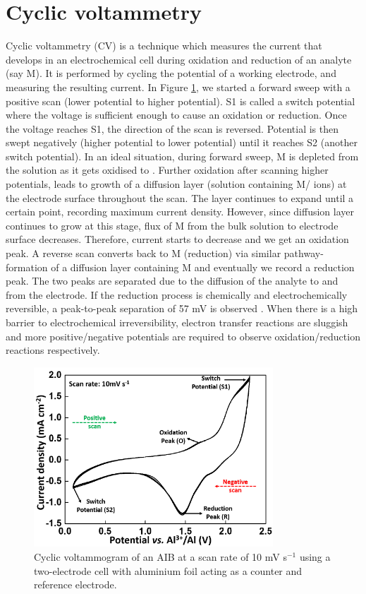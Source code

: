 \section{Cyclic voltammetry}
Cyclic voltammetry (CV) is a technique which measures the current that develops in an electrochemical cell during oxidation and reduction of an analyte (say M). It is performed by cycling the potential of a working electrode, and measuring the resulting current. In Figure \ref{Figures/chap2fig:CV}, we started a forward sweep with a positive scan (lower potential to higher potential). S1 is called a switch potential where the voltage is sufficient enough to cause an oxidation or reduction. Once the voltage reaches S1, the direction of the scan is reversed. Potential is then swept negatively (higher potential to lower potential) until it reaches S2 (another switch potential). In an ideal situation, during forward sweep, M is depleted from the solution as it gets oxidised to . Further oxidation after scanning higher potentials, leads to growth of a diffusion layer (solution containing M/ ions) at the electrode surface throughout the scan. The layer continues to expand until a certain point, recording maximum current density. However, since diffusion layer continues to grow at this stage, flux of M from the bulk solution to electrode surface decreases. Therefore, current starts to decrease and we get an oxidation peak. A reverse scan converts  back to M (reduction) via similar pathway- formation of a diffusion layer containing M and eventually we record a reduction peak. The two peaks are separated due to the diffusion of the analyte to and from the electrode. If the reduction process is chemically and electrochemically reversible, a peak-to-peak separation of 57 mV is observed \cite{bard_electrochemical_1980}. When there is a high barrier to electrochemical irreversibility, electron transfer reactions are sluggish and more positive/negative potentials are required to observe oxidation/reduction reactions respectively. 

\begin{figure}[tbh!]
\centering
\includegraphics[width=0.8\textwidth]{Figures/chap2fig/CV.pdf}
\caption{Cyclic voltammogram of an AIB at a scan rate of 10 mV s$^{-1}$ using a two-electrode cell with aluminium foil acting as a counter and reference electrode.}
\label{Figures/chap2fig:CV}
\end{figure}

